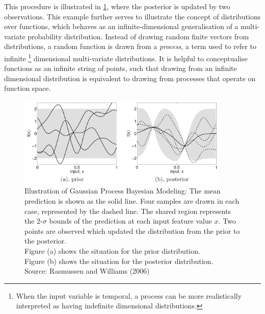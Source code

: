 			This procedure is illustrated in \cref{Background:OceanEnvironmentModeling:Figure:bayesianmodeling}, where the posterior is updated by two observations. This example further serves to illustrate the concept of distributions over functions, which behaves as an infinite-dimensional generalisation of a multi-variate probability distribution. Instead of drawing random finite vectors from distributions, a random function is drawn from a \textit{process}, a term used to refer to infinite \footnote{When the input variable is temporal, a process can be more realistically interpreted as having indefinite dimensional distributions.} dimensional multi-variate distributions. It is helpful to conceptualise functions as an infinite string of points, such that drawing from an infinite dimensional distribution is equivalent to drawing from processes that operate on function space.
			
			\begin{figure}[!htbp]
				\centering
					\includegraphics[width=0.9\textwidth]{Figures/bayesianmodeling.png}
				\caption{Illustration of Gaussian Process Bayesian Modeling: The mean prediction is shown as the solid line. Four samples are drawn in each case, represented by the dashed line. The shared region represents the 2-$\sigma$ bounds of the prediction at each input feature value $x$. Two points are observed which updated the distribution from the prior to the posterior.\\
				Figure (a) shows the situation for the prior distribution.\\
				Figure (b) shows the situation for the posterior distribution. \\
				Source: Rasmussen and Williams (2006) \citep{GaussianProcessForMachineLearning}}
				\label{Background:OceanEnvironmentModeling:Figure:bayesianmodeling}
			\end{figure}
			
